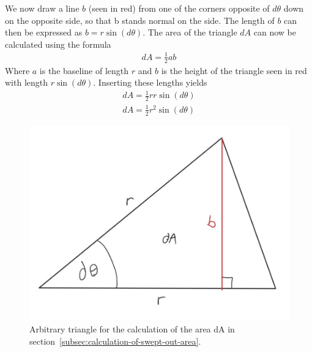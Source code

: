 \documentclass[reprint,english,notitlepage]{revtex4-2}
\begin{document}
	We now draw a line $b$ (seen in red) from one of the corners opposite of $d\theta$ down on the opposite side, so that b stands normal on the side.
	The length of $b$ can then be expressed as $b = r \sin\left(d\theta\right)$.
	The area of the triangle $dA$ can now be calculated using the formula
	\begin{align*}
		dA = \frac{1}{2} a b
	\end{align*}
	Where $a$ is the baseline of length $r$ and $b$ is the height of the triangle seen in red with length $r \sin\left(d\theta\right)$.
	Inserting these lengths yields
	\begin{align*}
	    dA = \frac{1}{2} r r \sin\left(d\theta\right)\\
		dA = \frac{1}{2} r^2 \sin\left(d\theta\right)
	\end{align*}


\begin{figure}[h]
	\centering
	\includegraphics[scale=0.4]{Figures/triangle_sas}
	\caption{Arbitrary triangle for the calculation of the area dA in section~\ref{subsec:calculation-of-swept-out-area}.}\label{fig:triangle_sas}
\end{figure}


\newpage
\newpage
\printbibliography
\end{document}
